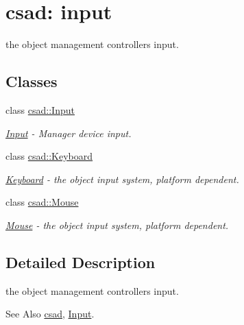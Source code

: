 \hypertarget{group__input}{\section{csad\-: input}
\label{group__input}
}


the object management controllers input.  


\subsection*{Classes}
\begin{DoxyCompactItemize}
\item 
class \hyperlink{classcsad_1_1_input}{csad\-::\-Input}
\begin{DoxyCompactList}\small\item\em \hyperlink{classcsad_1_1_input}{Input} -\/ Manager device input. \end{DoxyCompactList}\item 
class \hyperlink{classcsad_1_1_keyboard}{csad\-::\-Keyboard}
\begin{DoxyCompactList}\small\item\em \hyperlink{classcsad_1_1_keyboard}{Keyboard} -\/ the object input system, platform dependent. \end{DoxyCompactList}\item 
class \hyperlink{classcsad_1_1_mouse}{csad\-::\-Mouse}
\begin{DoxyCompactList}\small\item\em \hyperlink{classcsad_1_1_mouse}{Mouse} -\/ the object input system, platform dependent. \end{DoxyCompactList}\end{DoxyCompactItemize}


\subsection{Detailed Description}
the object management controllers input. \begin{DoxySeeAlso}{See Also}
\hyperlink{namespacecsad}{csad}, \hyperlink{classcsad_1_1_input}{Input}. 
\end{DoxySeeAlso}
